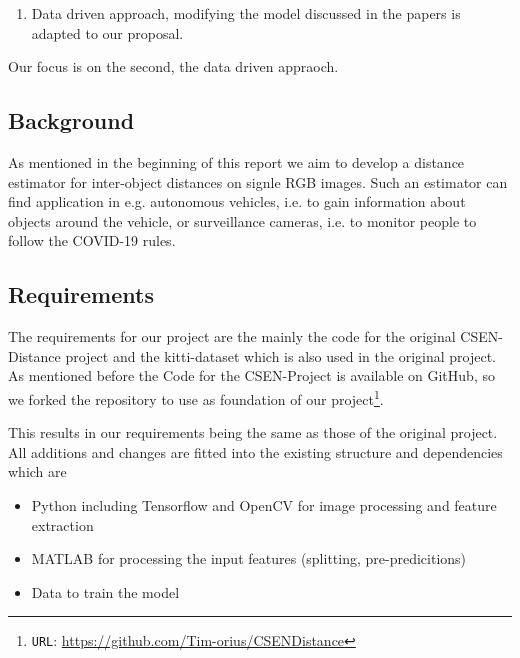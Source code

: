 \documentclass[a4paper, 11pt]{article}
\begin{document}
\begin{multicols}{2}
\begin{flushleft}
\begin{enumerate}
\item Data driven approach, modifying the model discussed in the papers is adapted to our proposal.
\end{enumerate}
Our focus is on the second, the data driven appraoch.
\end{flushleft}

\subsection{Background}
\begin{flushleft}
As mentioned in the beginning of this report we aim to develop a distance estimator for inter-object distances on signle RGB images. Such an estimator can find application in e.g. autonomous vehicles, i.e. to gain information about objects around the vehicle, or surveillance cameras, i.e. to monitor people to follow the COVID-19 rules.
\end{flushleft}

\subsection{Requirements}
\begin{flushleft}
The requirements for our project are the mainly the code for the original CSEN-Distance project \cite{ahishali2021representation} and the kitti-dataset \cite{Geiger2012CVPR} which is also used in the original project. As mentioned before the Code for the CSEN-Project is available on GitHub, so we forked the repository to use as foundation of our project\footnote{\texttt{URL}: \url{https://github.com/Tim-orius/CSENDistance}}.

This results in our requirements being the same as those of the original project. All additions and changes are fitted into the existing structure and dependencies which are
\begin{itemize}
\item Python including Tensorflow and OpenCV for image processing and feature extraction
\item MATLAB for processing the input features (splitting, pre-predicitions)
\item Data to train the model
\end{itemize}
\end{flushleft}


\end{multicols}
\end{document}

